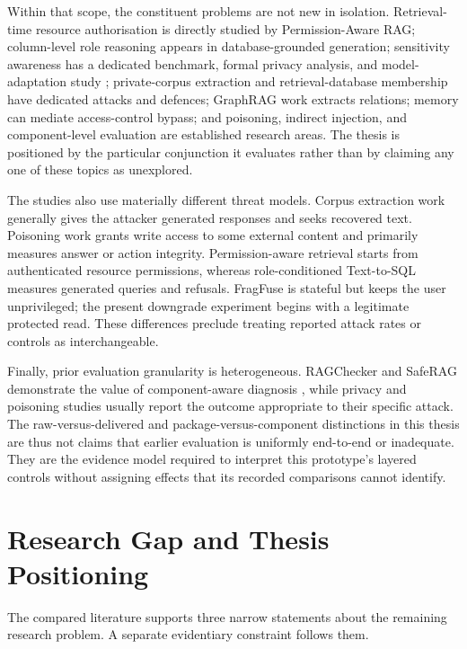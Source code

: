 Within that scope, the constituent problems are not new in isolation. Retrieval-time resource authorisation is directly studied by Permission-Aware RAG; column-level role reasoning appears in database-grounded generation; sensitivity awareness has a dedicated benchmark, formal privacy analysis, and model-adaptation study \citep{fazlija2025accessdenied,fazlija2026sensitivity}; private-corpus extraction and retrieval-database membership have dedicated attacks and defences; GraphRAG work extracts relations; memory can mediate access-control bypass; and poisoning, indirect injection, and component-level evaluation are established research areas. The thesis is positioned by the particular conjunction it evaluates rather than by claiming any one of these topics as unexplored.

The studies also use materially different threat models. Corpus extraction work generally gives the attacker generated responses and seeks recovered text. Poisoning work grants write access to some external content and primarily measures answer or action integrity. Permission-aware retrieval starts from authenticated resource permissions, whereas role-conditioned Text-to-SQL measures generated queries and refusals. FragFuse is stateful but keeps the user unprivileged; the present downgrade experiment begins with a legitimate protected read. These differences preclude treating reported attack rates or controls as interchangeable.

Finally, prior evaluation granularity is heterogeneous. RAGChecker and SafeRAG demonstrate the value of component-aware diagnosis \citep{ru2024ragchecker,liang2025saferag}, while privacy and poisoning studies usually report the outcome appropriate to their specific attack. The raw-versus-delivered and package-versus-component distinctions in this thesis are thus not claims that earlier evaluation is uniformly end-to-end or inadequate. They are the evidence model required to interpret this prototype's layered controls without assigning effects that its recorded comparisons cannot identify.

\section{Research Gap and Thesis Positioning}
\label{sec:background-gap}

The compared literature supports three narrow statements about the remaining research problem. A separate evidentiary constraint follows them.

